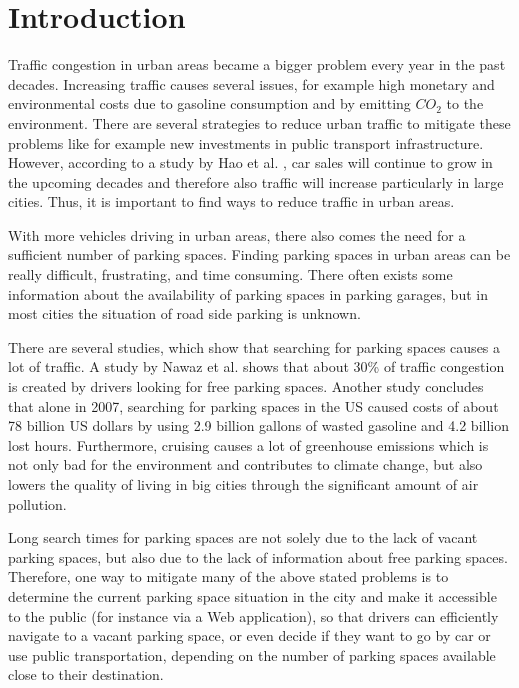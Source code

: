 \chapter{Introduction}
\label{chap:introduction}


Traffic congestion in urban areas became a bigger problem every year in the past decades. Increasing traffic causes several issues, for example high monetary and environmental costs due to gasoline consumption and by emitting $CO_2$ to the environment. There are several strategies to reduce urban traffic to mitigate these problems like for example new investments in public transport infrastructure. However, according to a study by Hao et al. \cite{HAO2016121}, car sales will continue to grow in the upcoming decades and therefore also traffic will increase particularly in large cities. Thus, it is important to find ways to reduce traffic in urban areas.

With more vehicles driving in urban areas, there also comes the need for a sufficient number of parking spaces. Finding parking spaces in urban areas can be really difficult, frustrating, and time consuming. There often exists some information about the availability of parking spaces in parking garages, but in most cities the situation of road side parking is unknown. 

There are several studies, which show that searching for parking spaces causes a lot of traffic. A study by Nawaz et al. \cite{Nawaz:2013:PSB:2500423.2500438} shows that about 30\% of traffic congestion is created by drivers looking for free parking spaces. Another study \cite{TexasMobilityReport} concludes that alone in 2007, searching for parking spaces in the US caused costs of about 78 billion US dollars by using 2.9 billion gallons of wasted gasoline and 4.2 billion lost hours. Furthermore, cruising causes a lot of greenhouse emissions which is not only bad for the environment and contributes to climate change, but also lowers the quality of living in big cities through the significant amount of air pollution.

Long search times for parking spaces are not solely due to the lack of vacant parking spaces, but also due to the lack of information about free parking spaces. Therefore, one way to mitigate many of the above stated problems is to determine the current parking space situation in the city and make it accessible to the public (for instance via a Web application), so that drivers can efficiently navigate to a vacant parking space, or even decide if they want to go by car or use public transportation, depending on the number of parking spaces available close to their destination. 




